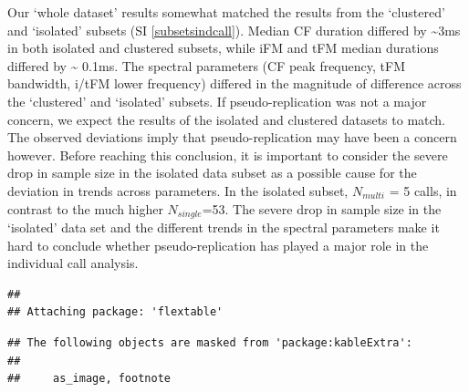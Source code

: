 \documentclass[
]{book}
\begin{document}
Our `whole dataset' results somewhat matched the results from the `clustered' and `isolated' subsets (SI \ref{subsetsindcall}). Median CF duration differed by \textasciitilde3ms in both isolated and clustered subsets, while iFM and tFM median durations differed by \textasciitilde{} 0.1ms. The spectral parameters (CF peak frequency, tFM bandwidth, i/tFM lower frequency) differed in the magnitude of difference across the `clustered' and `isolated' subsets. If pseudo-replication was not a major concern, we expect the results of the isolated and clustered datasets to match. The observed deviations imply that pseudo-replication may have been a concern however. Before reaching this conclusion, it is important to consider the severe drop in sample size in the isolated data subset as a possible cause for the deviation in trends across parameters. In the isolated subset, \(N_{multi}\) = 5 calls, in contrast to the much higher \(N_{single}\)=53. The severe drop in sample size in the `isolated' data set and the different trends in the spectral parameters make it hard to conclude whether pseudo-replication has played a major role in the individual call analysis.

\begin{verbatim}
## 
## Attaching package: 'flextable'
\end{verbatim}

\begin{verbatim}
## The following objects are masked from 'package:kableExtra':
## 
##     as_image, footnote
\end{verbatim}

\providecommand{\docline}[3]{\noalign{\global\setlength{\arrayrulewidth}{#1}}\arrayrulecolor[HTML]{#2}\cline{#3}}

\setlength{\tabcolsep}{8pt}

\renewcommand*{\arraystretch}{1.5}
\end{document}
